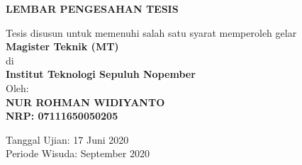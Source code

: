 \AddToShipoutPicture*{\BackgroundImage}

\begin{center}
	\large\textbf{LEMBAR PENGESAHAN TESIS}
\end{center}

\begin{center}
	Tesis disusun untuk memenuhi salah satu syarat memperoleh gelar\\
	\textbf{Magister Teknik (MT)}\\
	di\\
	\textbf{Institut Teknologi Sepuluh Nopember}\\
	Oleh:\\
	\textbf{NUR ROHMAN WIDIYANTO}\\
	\textbf{NRP: 07111650050205}
\end{center}

\begin{center}
	Tanggal Ujian: 17 Juni 2020\\
	Periode Wisuda: September 2020
\end{center}

